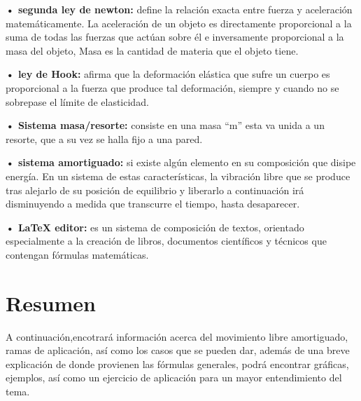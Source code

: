 \documentclass[12pt,a4paper]{article}
\begin{document}
\begin{flushleft}

\textbf{• segunda ley de newton:}
define la relación exacta entre fuerza y aceleración matemáticamente. La aceleración de un objeto es directamente proporcional a la suma de todas las fuerzas que actúan sobre él e inversamente proporcional a la masa del objeto, Masa es la cantidad de materia que el objeto tiene.

\vspace{0.5cm}

\textbf{• ley de Hook:}
afirma que la deformación elástica que sufre un cuerpo es proporcional a la fuerza que produce tal deformación, siempre y cuando no se sobrepase el límite de elasticidad.

\vspace{0.5cm}

\textbf{• Sistema masa/resorte:}
consiste en una masa “m” esta va unida a un resorte, que a su vez se halla fijo a una pared.

\vspace{0.5cm}

\textbf{• sistema amortiguado:}
si existe algún elemento en su composición que disipe energía. En un sistema de estas características, la vibración libre que se produce tras alejarlo de su posición de equilibrio y liberarlo a continuación irá disminuyendo a medida que transcurre el tiempo, hasta desaparecer.

\vspace{0.5cm}

\textbf{• LaTeX editor:}
es un sistema de composición de textos, orientado especialmente a la creación de libros, documentos científicos y técnicos que contengan fórmulas matemáticas.

\end{flushleft}

\vspace{1cm}

\section*{Resumen}
A continuación,encotrará información acerca del movimiento libre amortiguado, ramas de aplicación, así como los casos que se pueden dar, además de una breve explicación de donde provienen las fórmulas generales, podrá encontrar gráficas, ejemplos, así como un ejercicio de aplicación para un mayor entendimiento del tema.

\vspace{1cm}
\end{document}
